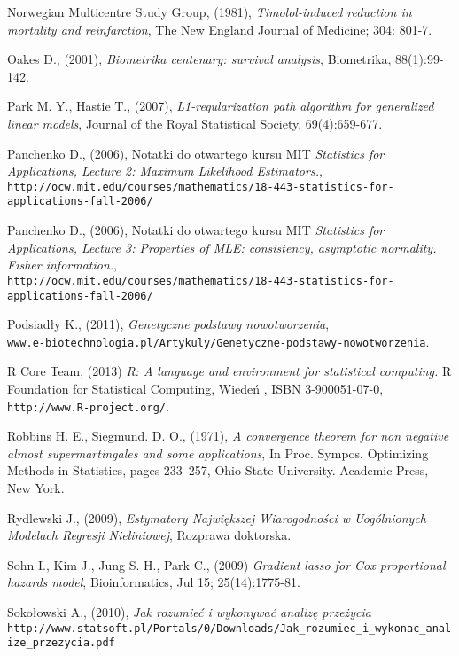 \begin{thebibliography}{99}
 Norwegian Multicentre Study Group, (1981), \textit{Timolol-induced reduction in
mortality and reinfarction}, The New England  Journal of Medicine; 304: 801-7.

 Oakes D., (2001), \textit{Biometrika centenary: survival analysis}, Biometrika, 88(1):99-142.


 Park M. Y., Hastie T., (2007), \textit{L1-regularization path algorithm for generalized linear models}, Journal of the Royal Statistical Society, 69(4):659-677.

 Panchenko D., (2006), Notatki do otwartego kursu MIT \textit{Statistics for Applications, Lecture 2: Maximum Likelihood Estimators.}, \\
\texttt{http://ocw.mit.edu/courses/mathematics/18-443-statistics-for-applications-fall-2006/}

 Panchenko D., (2006), Notatki do otwartego kursu MIT \textit{Statistics for Applications, Lecture 3: Properties of MLE: consistency, asymptotic normality. Fisher information.}, \\
\texttt{http://ocw.mit.edu/courses/mathematics/18-443-statistics-for-applications-fall-2006/}

 Podsiadły K., (2011), \textit{Genetyczne podstawy nowotworzenia}, \\ \texttt{www.e-biotechnologia.pl/Artykuly/Genetyczne-podstawy-nowotworzenia}.

 R Core Team, (2013) \textit{R: A language and environment for statistical computing.} R Foundation for Statistical Computing, Wiedeń , ISBN 3-900051-07-0, \\ \texttt{http://www.R-project.org/}.


 Robbins H. E., Siegmund. D. O., (1971), \textit{A convergence theorem for non negative almost supermartingales and some applications}, In Proc. Sympos. Optimizing Methods in Statistics, pages 233–257, Ohio State
University. Academic Press, New York.

 Rydlewski J., (2009), \textit{Estymatory Największej Wiarogodności w Uogólnionych Modelach Regresji Nieliniowej}, Rozprawa doktorska.

 Sohn I., Kim J., Jung S. H., Park C., (2009) \textit{Gradient lasso for Cox proportional hazards model}, Bioinformatics, Jul 15; 25(14):1775-81.


 Sokołowski A., (2010), \textit{Jak rozumieć i wykonywać analizę przeżycia} \\ \texttt{http://www.statsoft.pl/Portals/0/Downloads/Jak\_rozumiec\_i\_wykonac\_analize\_przezycia.pdf}


\end{thebibliography}
